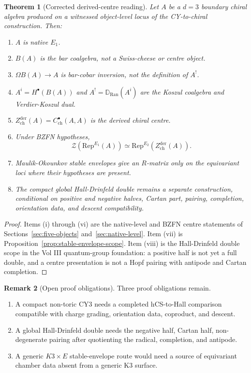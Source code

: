 \documentclass[11pt]{amsart}
\newtheorem{thm}{Theorem}[section]
\theoremstyle{definition}
\newtheorem{rem}[thm]{Remark}
\newcommand{\cZ}{\mathcal Z}
\newcommand{\Rep}{\mathrm{Rep}}
\newcommand{\Ran}{\mathrm{Ran}}
\newcommand{\Zderch}{Z^{\mathrm{der}}_{\mathrm{ch}}}
\begin{document}
\begin{thm}[Corrected derived-centre reading]
\label{thm:corrected-derived-centre-reading}
Let $A$ be a $d=3$ boundary chiral algebra produced on a witnessed
object-level locus of the CY-to-chiral construction.  Then:
\begin{enumerate}[label=\textup{(\roman*)}]
\item $A$ is native $E_1$.
\item $B(A)$ is the bar coalgebra, not a Swiss-cheese or centre object.
\item $\Omega B(A)\to A$ is bar-cobar inversion, not the definition of
$A^!$.
\item $A^i=H^\bullet(B(A))$ and $A^!=\mathbb D_{\Ran}(A^i)$ are the
Koszul coalgebra and Verdier-Koszul dual.
\item $\Zderch(A)=C^\bullet_{\mathrm{ch}}(A,A)$ is the derived chiral
centre.
\item Under BZFN hypotheses,
\[
  \cZ(\Rep^{E_1}(A))\simeq \Rep^{E_2}(\Zderch(A)).
\]
\item Maulik-Okounkov stable envelopes give an $R$-matrix only on the
equivariant loci where their hypotheses are present.
\item The compact global Hall-Drinfeld double remains a separate
construction, conditional on positive and negative halves, Cartan part,
pairing, completion, orientation data, and descent compatibility.
\end{enumerate}
\end{thm}

\begin{proof}
Items (i) through (vi) are the native-level and BZFN centre statements
of Sections~\ref{sec:five-objects} and~\ref{sec:native-level}.  Item
(vii) is Proposition~\ref{prop:stable-envelope-scope}.  Item (viii) is
the Hall-Drinfeld double scope in the Vol III quantum-group foundation:
a positive half is not yet a full double, and a centre presentation is
not a Hopf pairing with antipode and Cartan completion.
\end{proof}

\begin{rem}[Open proof obligations]
\label{rem:open-obligations}
Three proof obligations remain.
\begin{enumerate}[label=\textup{(\alph*)}]
\item A compact non-toric CY3 needs a completed hCS-to-Hall comparison
compatible with charge grading, orientation data, coproduct, and descent.
\item A global Hall-Drinfeld double needs the negative half, Cartan half,
non-degenerate pairing after quotienting the radical, completion, and
antipode.
\item A generic $K3\times E$ stable-envelope route would need a source
of equivariant chamber data absent from a generic K3 surface.
\end{enumerate}
\end{rem}
\end{document}
